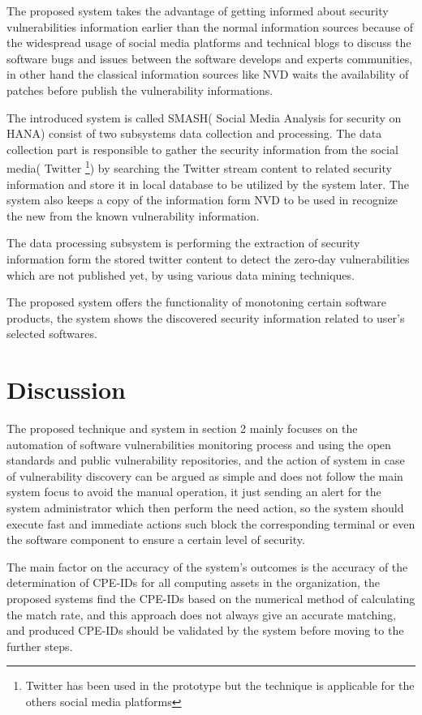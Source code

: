 \documentclass{llncs}
\begin{document}
The proposed system takes the advantage of getting informed about security vulnerabilities  information earlier than the normal information sources because of the widespread usage of social media platforms and technical blogs to discuss the software bugs and issues between the software develops and experts communities, in other hand the classical information sources like NVD waits the availability of patches before publish the vulnerability informations.
\par The introduced system is called SMASH( Social Media Analysis for security on HANA) consist of two subsystems data collection and processing. The data collection part is responsible to gather the security information from the social media( Twitter \footnote{Twitter has been used in the prototype but the technique is applicable for the others social media platforms}) by searching the Twitter stream content to related security information and store it in local database to be utilized by the system later. The system also keeps a copy of the information form NVD to be used in recognize the new from the known vulnerability information.
\par
The data processing subsystem is performing the extraction of security information form the stored twitter content to detect the zero-day vulnerabilities which are not published yet, by using various data mining techniques.

The proposed system offers the functionality of monotoning certain software products, the system shows the discovered security information related to user's selected softwares.
  

\section{Discussion}

\par The proposed technique and system in section 2 mainly focuses on the automation of software vulnerabilities monitoring process and using the open standards and public vulnerability repositories, and the action of system in case of vulnerability  discovery can be argued as simple and does not follow the main system focus to avoid the manual operation, it just sending an alert for the system administrator which then perform the need action, so the system should execute fast and immediate actions such block the corresponding terminal or even the software component to ensure a certain level of security. 

\par The main factor on the accuracy of the system's outcomes is the accuracy of the determination of CPE-IDs for all computing assets in the organization, the proposed systems find the CPE-IDs based on the numerical method of calculating the match rate, and this approach does not always give an accurate matching, and produced CPE-IDs should be validated by the system before moving to the further steps.
\end{document}
